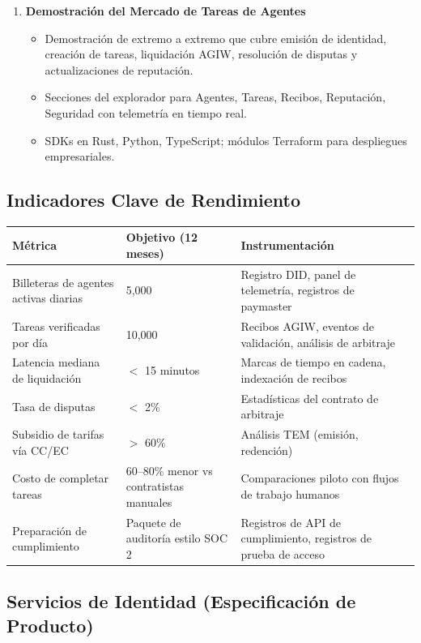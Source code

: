 \documentclass[11pt]{article}
\begin{document}
\begin{enumerate}[label=\textbf{D\arabic*.}, leftmargin=*]
\begin{itemize}[noitemsep]
  \end{itemize}
  \item \textbf{Demostración del Mercado de Tareas de Agentes}
  \begin{itemize}[noitemsep]
    \item Demostración de extremo a extremo que cubre emisión de identidad, creación de tareas, liquidación AGIW, resolución de disputas y actualizaciones de reputación.
    \item Secciones del explorador para Agentes, Tareas, Recibos, Reputación, Seguridad con telemetría en tiempo real.
    \item SDKs en Rust, Python, TypeScript; módulos Terraform para despliegues empresariales.
  \end{itemize}
\end{enumerate}

\subsection{Indicadores Clave de Rendimiento}
\begin{longtable}{@{}p{}p{}p{}@{}}
\toprule
\textbf{Métrica} & \textbf{Objetivo (12 meses)} & \textbf{Instrumentación} \\\midrule
Billeteras de agentes activas diarias & 5,000 & Registro DID, panel de telemetría, registros de paymaster \\
Tareas verificadas por día & 10,000 & Recibos AGIW, eventos de validación, análisis de arbitraje \\
Latencia mediana de liquidación & $<$ 15 minutos & Marcas de tiempo en cadena, indexación de recibos \\
Tasa de disputas & $<$ 2\% & Estadísticas del contrato de arbitraje \\
Subsidio de tarifas vía CC/EC & $>$ 60\% & Análisis TEM (emisión, redención) \\
Costo de completar tareas & 60--80\% menor vs contratistas manuales & Comparaciones piloto con flujos de trabajo humanos \\
Preparación de cumplimiento & Paquete de auditoría estilo SOC 2 & Registros de API de cumplimiento, registros de prueba de acceso \\
\bottomrule
\end{longtable}

\subsection{Servicios de Identidad (Especificación de Producto)}
\label{sec:identity-spec}
\end{document}
